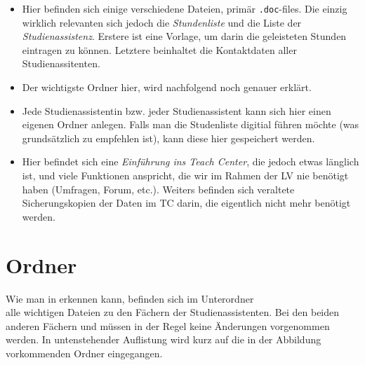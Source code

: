 \begin{itemize}
  \item {} Hier befinden sich einige verschiedene
    Dateien, primär {\tt .doc}-files. Die einzig wirklich relevanten sich jedoch
    die {\it Stundenliste} und die Liste der {\it Studienassistenz}. Erstere ist
    eine Vorlage, um darin die geleisteten Stunden eintragen zu können. Letztere
    beinhaltet die Kontaktdaten aller Studienassitenten.
  \item {} Der wichtigste Ordner hier, wird
    nachfolgend noch genauer erklärt.
  \item {} Jede Studienassistentin bzw.
    jeder Studienassistent kann sich hier einen eigenen Ordner anlegen.
    Falls man die Studenliste digitial führen möchte (was grundsätzlich zu
    empfehlen ist), kann diese hier gespeichert werden.
  \item {} Hier befindet sich eine 
    {\it Einführung ins Teach Center}, die jedoch etwas länglich ist, und viele
    Funktionen anspricht, die wir im Rahmen der LV nie benötigt haben
    (Umfragen, Forum, etc.). Weiters befinden sich veraltete Sicherungskopien
    der Daten im TC darin, die eigentlich nicht mehr benötigt werden. 
\end{itemize}

\section{Ordner }

Wie man in  erkennen kann, befinden sich im Unterordner\\
 alle wichtigen Dateien zu
den Fächern der Studienassistenten. Bei den beiden anderen Fächern
 und  müssen in der Regel
keine Änderungen vorgenommen werden. In untenstehender Auflistung wird kurz auf
die in der Abbildung vorkommenden Ordner eingegangen.

